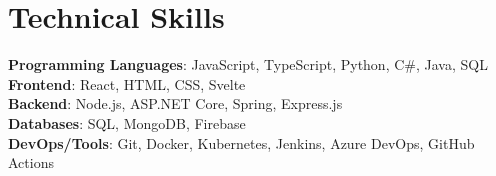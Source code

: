 \section{Technical Skills}
 \begin{itemize}[leftmargin=0.15in, label={}]
    \small{\item{
      \textbf{Programming Languages}{: JavaScript, TypeScript, Python, C\#, Java, SQL} \\
      \textbf{Frontend}{: React, HTML, CSS, Svelte} \\
      \textbf{Backend}{: Node.js, ASP.NET Core, Spring, Express.js} \\
      \textbf{Databases}{: SQL, MongoDB, Firebase} \\
      \textbf{DevOps/Tools}{: Git, Docker, Kubernetes, Jenkins, Azure DevOps, GitHub Actions} \\
    }}
 \end{itemize}